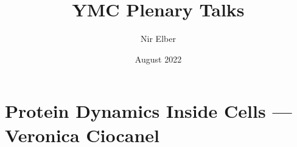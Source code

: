 \documentclass{article}
\title{YMC Plenary Talks}
\author{Nir Elber}
\date{August 2022}
\begin{document}
\maketitle

\tableofcontents

\section{Protein Dynamics Inside Cells --- Veronica Ciocanel}
\end{document}
